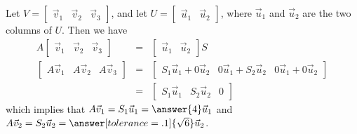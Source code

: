 \documentclass{ximera}
\begin{document}
\begin{example}
Let $V=\left[\begin{array}{ccc} \vec{v}_1 & \vec{v}_2 & \vec{v}_3 \end{array}\right]$, and
let $U=\left[\begin{array}{cc} \vec{u}_1 & \vec{u}_2 \end{array}\right]$, where
$\vec{u}_1$ and $\vec{u}_2$ are the two columns of $U$. Then we have
\begin{eqnarray*}
A\left[\begin{array}{ccc} \vec{v}_1 & \vec{v}_2 & \vec{v}_3 \end{array}\right]
&=& \left[\begin{array}{cc} \vec{u}_1 & \vec{u}_2 \end{array}\right]S\\
\left[\begin{array}{ccc} A\vec{v}_1 & A\vec{v}_2 & A\vec{v}_3 \end{array}\right]
&=& \left[\begin{array}{ccc} S_1\vec{u}_1 + 0\vec{u}_2 &
0\vec{u}_1 + S_2 \vec{u}_2 & 0 \vec{u}_1 + 0\vec{u}_2 \end{array}\right] \\
&=& \left[\begin{array}{ccc} S_1\vec{u}_1 & S_2 \vec{u}_2 &
0 \end{array}\right]
\end{eqnarray*}
which implies that $A\vec{v}_1=S_1\vec{u}_1 = \answer{4}\vec{u}_1$ and
$A\vec{v}_2=S_2\vec{u}_2 = \answer[tolerance=.1]{\sqrt{6}} \vec{u}_2$. 


\end{example}
\end{document}
